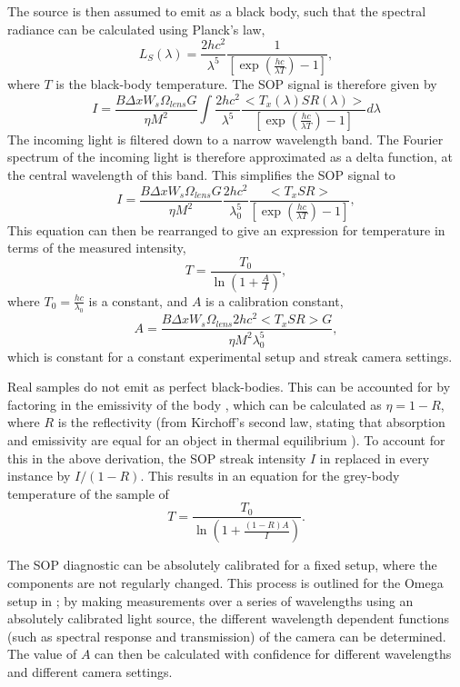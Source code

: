 The source is then assumed to emit as a black body, such that the spectral radiance can be calculated using Planck's law, 
\begin{equation} L_S(\lambda) =  \frac{2hc^2}{\lambda^5} \frac{1}{[\exp(\frac{hc}{\lambda T}) - 1]}, \end{equation} where $T$ is the black-body temperature. The SOP signal is therefore given by 
\begin{equation} I = \frac{B \Delta x W_s \Omega_{lens} G}{\eta M^2} \int {\frac{2hc^2}{\lambda^5} \frac{<T_x(\lambda)SR(\lambda)>}{[\exp(\frac{hc}{\lambda T}) - 1]} d\lambda} \end{equation}
The incoming light is filtered down to a narrow wavelength band. The Fourier spectrum of the incoming light is therefore approximated as a delta function, at the central wavelength of this band. This simplifies the SOP signal to
\begin{equation} I = \frac{B \Delta x W_s \Omega_{lens} G}{\eta M^2} \frac{2hc^2}{\lambda_0^5} \frac{<T_x SR> }{ [\exp(\frac{hc}{\lambda T}) - 1]} , \end{equation}
This equation can then be rearranged to give an expression for temperature in terms of the measured intensity, 
\begin{equation} T = \frac{T_0}{\ln(1 + \frac{A}{I})}, \end{equation}
where $T_0 = \frac{hc}{\lambda_0}$ is a constant, and $A$ is a calibration constant,
\begin{equation} A = \frac{B \Delta x W_s \Omega_{lens} 2hc^2 <T_x SR> G}{\eta M^2 \lambda_0^5} , \end{equation}
which is constant for a constant experimental setup and streak camera settings.

Real samples do not emit as perfect black-bodies. This can be accounted for by factoring in the emissivity of the body \cite{Gregor2016}, which can be calculated as $\eta = 1 - R$, where $R$ is the reflectivity (from Kirchoff's second law, stating that absorption and emissivity are equal for an object in thermal equilibrium \cite{Zeldovich1966}). To account for this in the above derivation, the SOP streak intensity $I$ in replaced in every instance by $I/(1-R)$. This results in an equation for the grey-body temperature of the sample of \begin{equation} T = \frac{T_0}{\ln(1 + \frac{(1-R)A}{I})}. \label{eqn: SOP eqn} \end{equation}

The SOP diagnostic can be absolutely calibrated for a fixed setup, where the components are not regularly changed. This process is outlined for the Omega setup in \cite{Gregor2016}; by making measurements over a series of wavelengths using an absolutely calibrated light source, the different wavelength dependent functions (such as spectral response and transmission) of the camera can be determined. The value of $A$ can then be calculated with confidence for different wavelengths and different camera settings. 

